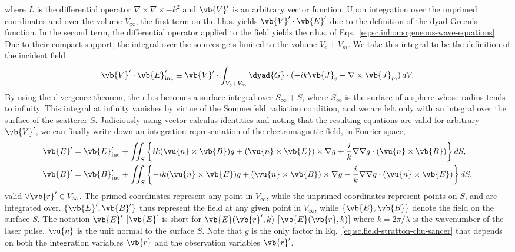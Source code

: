 \documentclass[11pt,SymmetricalJury]{inrsthesis/inrsthesis}
\begin{document}
where $L$ is the differential operator $\nabla\times\nabla\times-k^2$ and
$\vb{V}'$ is an arbitrary vector function. Upon integration over the unprimed
coordinates and over the volume $V_\infty$, the first term on the l.h.s. yields
$\vb{V}'\cdot\vb{E}'$ due to the definition of the dyad Green's function. In the
second term, the differential operator applied to the field yields the r.h.s. of
Eqs.~\ref{eq:sc.inhomogeneous-wave-equations}. Due to their compact support, the
integral over the sources gets limited to the volume $V_e+V_m$. We take this
integral to be the definition of the incident field
  \begin{equation}
    \vb{V}'\cdot\vb{E}_\text{inc}' \equiv \vb{V}'\cdot\int_{V_e+V_m}\dyad{G}\cdot\left(-ik\vb{J}_e+\nabla\times\vb{J}_m\right)dV.
  \end{equation}
By using the divergence theorem, the r.h.s becomes a surface integral over
$S_\infty+S$, where $S_\infty$ is the surface of a sphere whose radius tends to
infinity. This integral at infinity vanishes by virtue of the Sommerfeld
radiation condition, and we are left only with an integral over the surface of
the scatterer $S$. Judiciously using vector calculus identities \cite{Tai1997}
and noting that the resulting equations are valid for arbitrary $\vb{V}'$, we
can finally write down an integration representation of the electromagnetic
field, in Fourier space,
  \begin{subequations}
  \label{eq:sc.field-stratton-chu-sancer}
  \begin{align}
  \vb{E}' &=
     \vb{E}_\text{inc}'+\iint_{S}
    \left\{ ik(\vu{n}\times \vb{B})              g
          +   (\vu{n}\times \vb{E})\times \nabla g
          +\frac{i}{k}\nabla\nabla g\cdot(\vu{n}\times\vb{B})
    \right\} dS,
  \label{eq:sc.efield-stratton-chu-sancer}\\
  \vb{B}' &=
    \vb{B}_\text{inc}' + \iint_{S}
    \left\{-ik(\vu{n}\times \vb{E})              g
          +   (\vu{n}\times \vb{B})\times \nabla g
          -\frac{i}{k}\nabla\nabla g\cdot(\vu{n}\times\vb{E})
    \right\} dS.
  \label{eq:sc.bfield-stratton-chu-sancer}
  \end{align}
  \end{subequations}
valid $\forall\vb{r}'\in V_\infty$. The primed coordinates
represent any point in $V_\infty$, while the unprimed coordinates represent points
on $S$, and are integrated over. $\{\vb{E}', \vb{B}'\}$ thus represent the field at any
given point in $V_\infty$, while $\{\vb{E}, \vb{B}\}$ denote the field on the surface $S$.
The notation $\vb{E}'$ [$\vb{E}$] is short for $\vb{E}(\vb{r}',k)$ [$\vb{E}(\vb{r},k)$]
where $k=2\pi/\lambda$ is the wavenumber of the laser pulse. $\vu{n}$ is the unit normal
to the surface $S$. Note that $g$ is the
only factor in Eq.~\eqref{eq:sc.field-stratton-chu-sancer}
that depends on both the integration variables $\vb{r}$
and the observation variables $\vb{r}'$.
\end{document}
